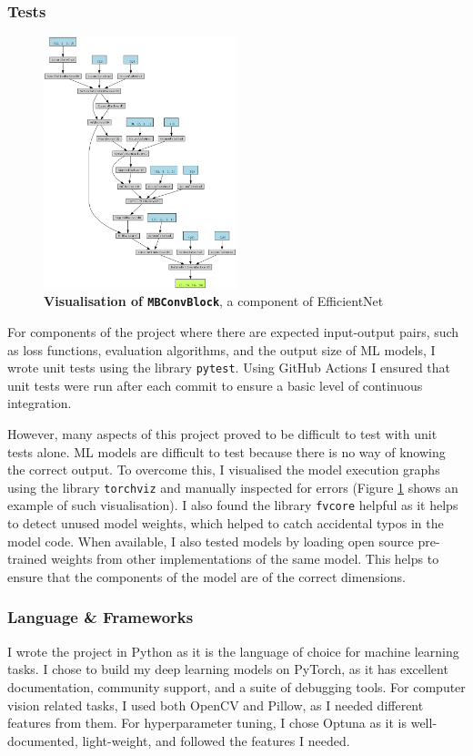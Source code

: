 \documentclass[12pt,a4paper,twoside,openany]{report}
\begin{document}
\subsubsection{Tests}
\begin{figure}
    \centering
    \includegraphics[width=0.5\textwidth]{figs/prep/torchviz_example.png.png}
    \caption{\textbf{Visualisation of \texttt{MBConvBlock}}, a component of EfficientNet \cite{tan_efficientnet_2020}}
    \label{fig: mbconvblock}
\end{figure}
For components of the project where there are expected input-output pairs, such as loss functions, evaluation algorithms, and the output size of ML models, I wrote unit tests using the library \verb|pytest|. Using GitHub Actions I ensured that unit tests were run after each commit to ensure a basic level of continuous integration. 

However, many aspects of this project proved to be difficult to test with unit tests alone. ML models are difficult to test because there is no way of knowing the correct output. To overcome this, I visualised the model execution graphs using the library \verb|torchviz| and manually inspected for errors (Figure \ref{fig: mbconvblock} shows an example of such visualisation). I also found the library \verb|fvcore| helpful as it helps to detect unused model weights, which helped to catch accidental typos in the model code. When available, I also tested models by loading open source pre-trained weights from other implementations of the same model. This helps to ensure that the components of the model are of the correct dimensions.


\subsubsection{Language \& Frameworks}
I wrote the project in Python as it is the language of choice for machine learning tasks. I chose to build my deep learning models on PyTorch, as it has excellent documentation, community support, and a suite of debugging tools. For computer vision related tasks, I used both OpenCV and Pillow, as I needed different features from them. For hyperparameter tuning, I chose Optuna as it is well-documented, light-weight, and followed the features I needed.
\end{document}
